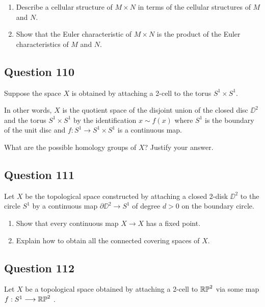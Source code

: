 \documentclass[12pt]{article}
\begin{document}
\begin{enumerate}
\def\labelenumi{\alph{enumi}.}
\item
  Describe a cellular structure of \(M \times N\) in terms of the
  cellular structures of \(M\) and \(N\).
\item
  Show that the Euler characteristic of \(M \times N\) is the product of
  the Euler characteristics of \(M\) and \(N\).
\end{enumerate}

\hypertarget{question-110-2}{%
\subsection{Question 110}\label{question-110-2}}

Suppose the space \(X\) is obtained by attaching a 2-cell to the torus
\(S^1 \times S^1\).

In other words, \(X\) is the quotient space of the disjoint union of the
closed disc \(\DD^2\) and the torus \(S^1 \times S^1\) by the
identification \(x \sim f(x)\) where \(S^1\) is the boundary of the unit
disc and \(f : S^1 \to S^1 \times S^1\) is a continuous map.

What are the possible homology groups of \(X\)? Justify your answer.

\hypertarget{question-111-2}{%
\subsection{Question 111}\label{question-111-2}}

Let \(X\) be the topological space constructed by attaching a closed
2-disk \(\DD^2\) to the circle \(S^1\) by a continuous map
\(\partial\DD^2 \to S^1\) of degree \(d > 0\) on the boundary circle.

\begin{enumerate}
\def\labelenumi{\alph{enumi}.}
\item
  Show that every continuous map \(X \to X\) has a fixed point.
\item
  Explain how to obtain all the connected covering spaces of \(X\).
\end{enumerate}

\hypertarget{question-112-2}{%
\subsection{Question 112}\label{question-112-2}}

Let \(X\) be a topological space obtained by attaching a 2-cell to
\({\mathbb{RP}}^2\) via some map \(f: S^1 \longrightarrow {\mathbb{RP}}^2\) .
\end{document}
